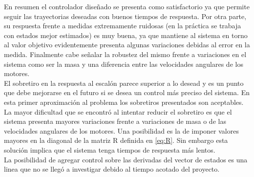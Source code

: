 \documentclass[main]{subfiles}
\begin{document}
En resumen el controlador diseñado se presenta como satisfactorio ya que permite seguir las trayectorias deseadas con buenos tiempos de respuesta. Por otra parte, su respuesta frente a medidas extremamente ruidosas (en la pr\'actica se trabaja con estados mejor estimados) es muy buena, ya que mantiene al sistema en torno al valor objetivo evidentemente presenta algunas variaciones debidas al error en la medida. Finalmente cabe señalar la robustez del mismo frente a variaciones en el sistema como ser la masa y una diferencia entre las velocidades angulares de los motores.\\

El sobretiro en la respuesta al escal\'on parece superior a lo desead y es un punto que debe mejorarse en el futuro si se desea un control m\'as preciso del sistema. En esta primer aproximaci\'on al problema los sobretiros presentados son aceptables. La mayor dificultad que se encontr\'o al intentar reducir el sobretiro es que el sistema presenta mayores variaciones frente a variaciones de masa o de las velocidades angulares de los motores. Una posibilidad es la de imponer valores mayores en la diagonal de la matriz R definida en \ref{eq:R}. Sin embargo esta soluci\'on implica que el sistema tenga tiempos de respuesta m\'as lentos.\\

La posibilidad de agregar control sobre las derivadas del vector de estados es una linea que no se lleg\'o a investigar debido al tiempo acotado del proyecto. 
\end{document}
